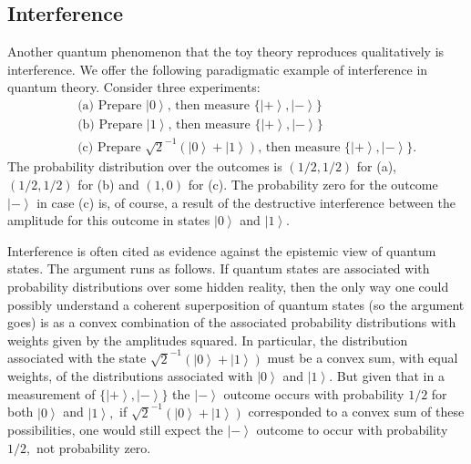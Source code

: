 \documentclass[pra,nofootinbib,showpacs,12pt]{revtex4}
\begin{document}
\subsection{Interference}

\label{interference}

Another quantum phenomenon that the toy theory reproduces qualitatively is
interference. We offer the following paradigmatic example of interference in
quantum theory. Consider three experiments:
\begin{eqnarray*}
&&\text{(a) Prepare }\left| 0\right\rangle \text{, then measure }\{\left|
+\right\rangle ,\left| -\right\rangle \} \\
&&\text{(b) Prepare }\left| 1\right\rangle \text{, then measure }\{\left|
+\right\rangle ,\left| -\right\rangle \} \\
&&\text{(c) Prepare }\sqrt{2}^{-1}\left( \left| 0\right\rangle +\left|
1\right\rangle \right) \text{, then measure }\{\left| +\right\rangle ,\left|
-\right\rangle \} \text{.}
\end{eqnarray*}
The probability distribution over the outcomes is $(1/2,1/2)$ for (a), $%
(1/2,1/2)$ for (b) and $(1,0)$ for (c). The probability zero for the outcome
$\left| -\right\rangle$ in case (c) is, of course, a result of the
destructive interference between the amplitude for this outcome in states $%
\left| 0\right\rangle$ and $\left| 1\right\rangle$.


Interference is often cited as evidence against the epistemic view of
quantum states. The argument runs as follows. If quantum states are
associated with probability distributions over some hidden reality, then the
only way one could possibly understand a coherent superposition of quantum
states (so the argument goes) is as a convex combination of the associated
probability distributions with weights given by the amplitudes squared. In
particular, the distribution associated with the state $\sqrt{2}^{-1}\left(
\left| 0\right\rangle +\left| 1\right\rangle \right) $ must be a convex sum,
with equal weights, of the distributions associated with $\left|
0\right\rangle $ and $\left| 1\right\rangle .$ But given that in a
measurement of $\{\left| +\right\rangle ,\left| -\right\rangle \}$ the $%
\left| -\right\rangle $ outcome occurs with probability $1/2$ for both $%
\left| 0\right\rangle $ and $\left| 1\right\rangle ,$ if $\sqrt{2}%
^{-1}\left( \left| 0\right\rangle +\left| 1\right\rangle \right) $
corresponded to a convex sum of these possibilities, one would still expect
the $\left| -\right\rangle $ outcome to occur with probability $1/2,$ not
probability zero.
\end{document}

